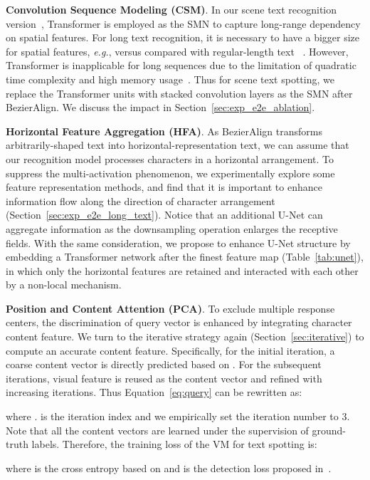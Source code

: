\documentclass[10pt,journal,compsoc]{IEEEtran}
\def\eg{{\it e.g.}\xspace}
\begin{document}
\textbf{Convolution Sequence Modeling (CSM)}. In our scene text recognition version~\cite{fang2021read}, Transformer is employed as the SMN to capture long-range dependency on spatial features. For long text recognition, it is necessary to have a bigger size for spatial features, \eg,  versus  compared with regular-length text ~\cite{liu2020abcnetv2}. However, Transformer is inapplicable for long sequences due to the limitation of quadratic time complexity and high memory usage~\cite{zhou2021informer}. Thus for scene text spotting, we replace the Transformer units with stacked convolution layers as the SMN after BezierAlign. We discuss the impact in Section~\ref{sec:exp_e2e_ablation}.


\textbf{Horizontal Feature Aggregation (HFA)}. As BezierAlign transforms arbitrarily-shaped text into horizontal-representation text, we can assume that our recognition model processes characters in a horizontal arrangement. To suppress the multi-activation phenomenon, we experimentally explore some feature representation methods, and find that it is important to enhance information flow along the direction of character arrangement (Section~\ref{sec:exp_e2e_long_text}). Notice that an additional U-Net can aggregate information as the downsampling operation enlarges the receptive fields. With the same consideration, we propose to enhance U-Net structure by embedding a Transformer network after the finest feature map (Table~\ref{tab:unet}), in which only the horizontal features are retained and interacted with each other by a non-local mechanism.


\textbf{Position and Content Attention (PCA)}. To exclude multiple response centers, the discrimination of query vector is enhanced by integrating character content feature. We turn to the iterative strategy again (Section~\ref{sec:iterative}) to compute an accurate content feature. Specifically, for the initial iteration, a coarse content vector is directly predicted based on . For the subsequent iterations, visual feature  is reused as the content vector and refined with increasing iterations. Thus Equation~\ref{eq:query} can be rewritten as:

where .  is the iteration index and we empirically set the iteration number to 3. Note that all the content vectors are learned under the supervision of ground-truth labels. Therefore, the training loss of the VM for text spotting is:

where  is the cross entropy based on  and  is the detection loss proposed in~\cite{liu2020abcnetv2,liu2020abcnet}.
\end{document}

